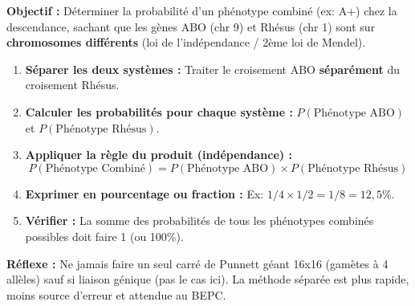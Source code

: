 \documentclass[11pt]{article}
\begin{document}
\begin{methode}
    \textbf{Objectif :} Déterminer la probabilité d'un phénotype combiné (ex: A+) chez la descendance, sachant que les gènes ABO (chr 9) et Rhésus (chr 1) sont sur \textbf{chromosomes différents} (loi de l'indépendance / 2ème loi de Mendel).
    \begin{enumerate}
        \item \textbf{Séparer les deux systèmes :} Traiter le croisement ABO \textbf{séparément} du croisement Rhésus.
        \item \textbf{Calculer les probabilités pour chaque système :} $P(\text{Phénotype ABO})$ et $P(\text{Phénotype Rhésus})$.
        \item \textbf{Appliquer la règle du produit (indépendance) :} 
        \[ P(\text{Phénotype Combiné}) = P(\text{Phénotype ABO}) \times P(\text{Phénotype Rhésus}) \]
        \item \textbf{Exprimer en pourcentage ou fraction :} Ex: $1/4 \times 1/2 = 1/8 = 12,5\%$.
        \item \textbf{Vérifier :} La somme des probabilités de tous les phénotypes combinés possibles doit faire 1 (ou 100\%).
    \end{enumerate}
    \textbf{Réflexe :} Ne jamais faire un seul carré de Punnett géant 16x16 (gamètes à 4 allèles) sauf si liaison génique (pas le cas ici). La méthode séparée est plus rapide, moins source d'erreur et attendue au BEPC.
\end{methode}
\end{document}
